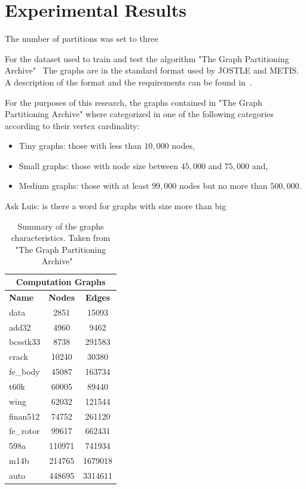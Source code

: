 %
%
\let\textcircled=\pgftextcircled
\chapter{Experimental Results}
\label{Chapter4}
The number of partitions was set to three 

For the dataset used to train and test the algorithm "The Graph Partitioning Archive"~\cite{archive}
The graphs are in the standard format used by JOSTLE and METIS. A description of the format and the requirements can be found in~\cite{jostle}.

For the purposes of this research, the graphs contained in "The Graph Partitioning Archive" where categorized in one of the following categories according to their vertex cardinality: 
\begin{itemize}
    \item Tiny graphs: those with less than $10,000$ nodes,
    \item Small graphs: those with node size between $45,000$ and $75,000$ and,
    \item Medium graphs: those with at least $99,000$ nodes but no more than $500,000$.
\end{itemize}

Ask Luis: is there a word for graphs with size more than big

\begin{table}
\centering
\begin{tabular}{ |p{1.75cm}||cc|  }
\hline
\multicolumn{3}{|c|}{\textbf{Computation Graphs}} \\
\hline
\hline
\textbf{Name} & \textbf{Nodes} & \textbf{Edges} \\
\hline
data & 2851 & 15093  \\
add32 & 4960 & 9462  \\
bcsstk33 & 8738 & 291583  \\
crack & 10240 & 30380  \\
\hline
fe\_body & 45087 & 163734  \\
t60k & 60005 & 89440  \\
wing & 62032 & 121544  \\
finan512 & 74752 & 261120 \\
\hline
fe\_rotor & 99617 & 662431  \\
598a & 110971 & 741934  \\
m14b & 214765 & 1679018	 \\
auto & 448695 & 3314611  \\
\hline
\end{tabular}
\caption{\label{tab:results}Summary of the graphs characteristics. Taken from "The Graph Partitioning Archive" ~\cite{archive}}
\end{table}

